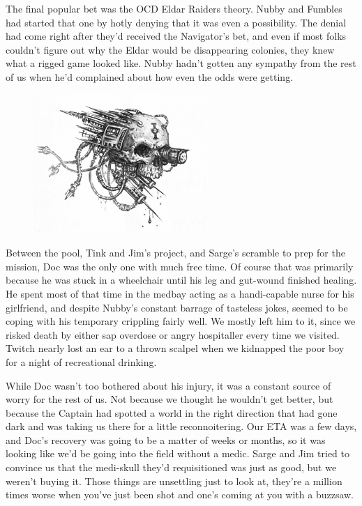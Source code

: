 The final popular bet was the OCD Eldar Raiders theory. 
Nubby and Fumbles had started that one by hotly denying that it was even a possibility. 
The denial had come right after they'd received the Navigator's bet, and even if most folks couldn't figure out why the Eldar would be disappearing colonies, they knew what a rigged game looked like. 
Nubby hadn't gotten any sympathy from the rest of us when he'd complained about how even the odds were getting.

\begin{figure}
	\begin{center}
		\includegraphics[width=\figwidth]{pics/11/11.png}
	\end{center}
\end{figure}
Between the pool, Tink and Jim's project, and Sarge's scramble to prep for the mission, Doc was the only one with much free time. 
Of course that was primarily because he was stuck in a wheelchair until his leg and gut-wound finished healing. 
He spent most of that time in the medbay acting as a handi-capable nurse for his girlfriend, and despite Nubby's constant barrage of tasteless jokes, seemed to be coping with his temporary crippling fairly well. 
We mostly left him to it, since we risked death by either sap overdose or angry hospitaller every time we visited. 
Twitch nearly lost an ear to a thrown scalpel when we kidnapped the poor boy for a night of recreational drinking.

While Doc wasn't too bothered about his injury, it was a constant source of worry for the rest of us. 
Not because we thought he wouldn't get better, but because the Captain had spotted a world in the right direction that had gone dark and was taking us there for a little reconnoitering. 
Our ETA was a few days, and Doc's recovery was going to be a matter of weeks or months, so it was looking like we'd be going into the field without a medic. 
Sarge and Jim tried to convince us that the medi-skull they'd requisitioned was just as good, but we weren't buying it. 
Those things are unsettling just to look at, they're a million times worse when you've just been shot and one's coming at you with a buzzsaw.

